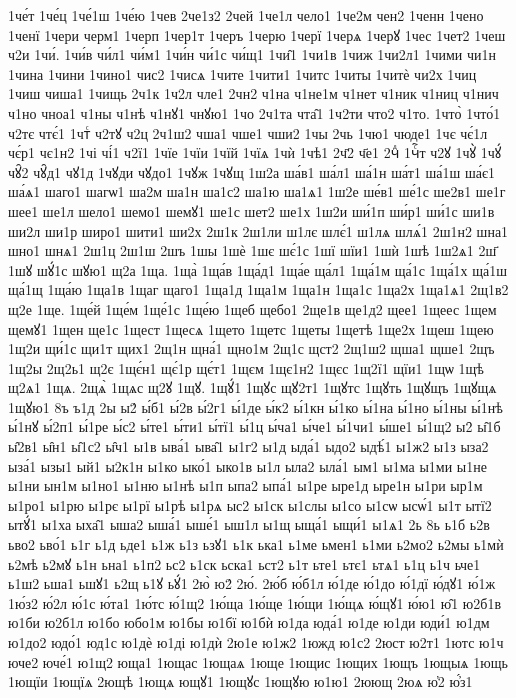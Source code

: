 {1че́т
1че́ц
1че́1ш
1че́ю
1чев
2че1з2
2чей
1че1л
чело1
1че2м
чен2
1ченн
1чено
1ченї
1чери
черм1
1черп
1чер1т
1черъ
1черю
1черї
1черѧ
1черꙋ
1чес
1чет2
1чеш
ч2и
1чи́.
1чи́в
чи́л1
чи́м1
1чи́н
чи́1с
чи́щ1
1чи̑1
1чи1в
1чиж
1чи2л1
1чими
чи1н
1чина
1чини
1чино1
чис2
1чисѧ
1чите
1чити1
1читс
1читы
1читѐ
чи2х
1чиц
1чиш
чиша1
1чищь
2ч1к
1ч2л
чле1
2чн2
ч1на
ч1не1м
ч1нет
ч1ник
ч1ниц
ч1нич
ч1но
чноа1
ч1ны
ч1нѣ
ч1нꙋ1
чнꙋю1
1чо
2ч1та
чта̑1
1ч2ти
что2
ч1то.
1что̀
1что́1
ч2тє
чтє́1
1чтⷭ
ч2тꙋ
ч2ц
2ч1ш2
чша1
чше1
чши2
1чы
2чь
1чю1
чюде1
1чє
чє́1л
чє́р1
чє1н2
1чі
чі́1
ч2ї1
1чїе
1чїи
1чїй
1чїѧ
1чѝ
1чѣ1
2ч҃2
ч҃е1
2чⷣ
1чⷭ҇т
ч2ꙋ
1чꙋ̀
1чꙋ́
чꙋ̑2
чꙋ̑д1
чꙋ1д
1чꙋди
чꙋдо1
1чꙋж
1чꙋщ
1ш2а
ша́в1
ша́л1
ша́1н
ша́т1
ша́1ш
ша́є1
ша́ѧ1
шаго1
шагѡ1
ша2м
ша1н
ша1с2
ша1ю
ша1ѧ1
1ш2е
ше́в1
ше́1с
ше2в1
ше1г
шее1
ше1л
шело1
шемо1
шемꙋ1
ше1с
шет2
ше1х
1ш2и
ши́1п
ши́р1
ши́1с
ши1в
ши2л
ши1р
широ1
шити1
ши2х
2ш1к
2ш1ли
ш1лє
шлє́1
ш1лѧ
шлѧ́1
2ш1н2
шна1
шно1
шнѧ1
2ш1ц
2ш1ш
2шъ
1шы
1шѐ
1шє
шє́1с
1шї
шїи1
1шѝ
1шѣ
1ш2ѧ1
2ш҃
1шꙋ
шꙋ́1с
шꙋю1
щ2а
1ща.
1ща̀
1ща́в
1ща́д1
1ща́е
ща́л1
1ща́1м
ща́1с
1ща́1х
ща́1ш
ща́1щ
1ща́ю
1ща1в
1щаг
щаго1
1ща1д
1ща1м
1ща1н
1ща1с
1ща2х
1ща1ѧ1
2щ1в2
щ2е
1ще.
1ще́й
1ще́м
1ще́1с
1ще́ю
1щеб
щебо1
2ще1в
ще1д2
щее1
1щеес
1щем
щемꙋ1
1щен
ще1с
1щест
1щесѧ
1щето
1щетс
1щеты
1щетѣ
1ще2х
1щеш
1щею
1щ2и
щи́1с
щи1т
щих1
2щ1н
щна́1
щно1м
2щ1с
щст2
2щ1ш2
щша1
щше1
2щъ
1щ2ы
2щ2ь1
щ2є
1щє́н1
щє́1р
щє́т1
1щєм
1щє1н2
1щєс
1щ2ї1
щїи1
1щѡ
1щѣ
щ2ѧ1
1щѧ.
2щѧ̀
1щѧс
щ2ꙋ
1щꙋ.
1щꙋ́1
1щꙋс
щꙋ2т1
1щꙋтс
1щꙋть
1щꙋщъ
1щꙋщѧ
1щꙋю1
8ъ 
ъ1д
2ы
ы2́
ы́б1
ы́2в
ы́2г1
ы́1де
ы́к2
ы́1кн
ы́1ко
ы́1на
ы́1но
ы́1ны
ы́1нѣ
ы́1нꙋ
ы́2п1
ы́1ре
ы́с2
ы́те1
ы́ти1
ы́тї1
ы́1ц
ы́ча1
ы́че1
ы́1чи1
ы́ше1
ы́1щ2
ы2̑
ы̑1б
ы̑2в1
ы̑н1
ы̑1с2
ы̑ч1
ы1в
ыва́1
ыва̑1
ы1г2
ы1д
ыда́1
ыдо2
ыдѣ́1
ы1ж2
ы1з
ыза2
ыза́1
ызы1
ый1
ы2к1н
ы1ко
ыко́1
ыко1в
ы1л
ыла2
ыла́1
ым1
ы1ма
ы1ми
ы1не
ы1ни
ын1м
ы1но1
ы1ню
ы1нѣ
ы1п
ыпа2
ыпа́1
ы1ре
ыре1д
ыре1н
ы1ри
ыр1м
ы1ро1
ы1рю
ы1рє
ы1рї
ы1рѣ
ы1рѧ
ыс2
ы1ск
ы1слы
ы1со
ы1сѡ
ысѡ́1
ы1т
ытї2
ытꙋ́1
ы1ха
ыха̑1
ыша2
ыша́1
ыше́1
ыш1л
ы1щ
ыща́1
ыщи́1
ы1ѧ1
2ь
8ь 
ь1б
ь2в
ьво2
ьво́1
ь1г
ь1д
ьде1
ь1ж
ь1з
ьзꙋ1
ь1к
ька1
ь1ме
ьмен1
ь1ми
ь2мо2
ь2мы
ь1мѝ
ь2мѣ
ь2мꙋ
ь1н
ьна1
ь1п2
ьс2
ь1ск
ьска1
ьст2
ь1т
ьте1
ьтє1
ьтѧ1
ь1ц
ь1ч
ьче1
ь1ш2
ьша1
ьшꙋ1
ь2щ
ь1ꙋ
ьꙋ́1
2ю̀
ю2́
2ю́.
2ю́б
ю́б1л
ю́1де
ю́1до
ю́1дї
ю́дꙋ1
ю́1ж
1ю́з2
ю́2л
ю́1с
ю́та1
1ю́тс
ю́1щ2
1ю́ща
1ю́ще
1ю́щи
1ю́щѧ
ю́щꙋ1
ю́ю1
ю̑1
ю2б1в
ю1би
ю2б1л
ю1бо
юбо1м
ю1бы
ю1бї
ю1бѝ
ю1да
юда́1
ю1де
ю1ди
юди́1
ю1дм
ю1до2
юдо́1
юд1с
ю1дѐ
ю1ді
ю1дѝ
2ю1е
ю1ж2
1южд
ю1с2
2юст
ю2т1
1ютс
ю1ч
юче2
юче́1
ю1щ2
юща1
1ющас
1ющаѧ
1юще
1ющис
1ющих
1ющъ
1ющыѧ
1ющь
1ющїи
1ющїѧ
2ющѣ
1ющѧ
ющꙋ1
1ющꙋс
1ющꙋю
ю1ю1
2юющ
2юѧ
ю҆2
ю҆́з1
}
